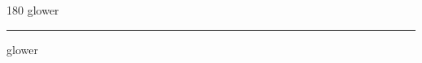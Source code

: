 
\begin{frame}
\begin{center}
\begin{turn}{180}
{\fontsize{2.5cm}{1em}\selectfont glower}
\end{turn}
\vspace{1em}\par  
\hrule
\vspace{1em}\par  
{\fontsize{2.5cm}{1em}\selectfont glower}
\end{center}
\end{frame}
